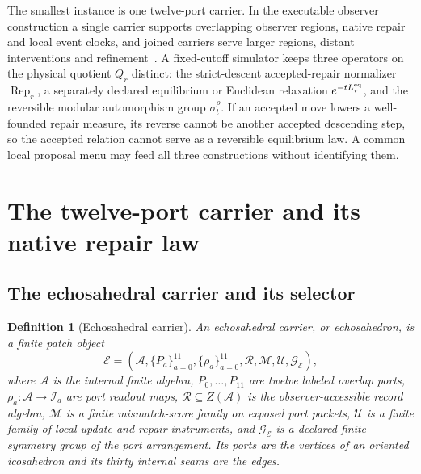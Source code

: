 \documentclass[11pt]{article}
\newtheorem{definition}[theorem]{Definition}
\theoremstyle{remark}
\theoremstyle{plain}
\begin{document}
The smallest instance is one twelve-port carrier. In the executable observer
construction a single carrier supports overlapping observer regions, native
repair and local event clocks, and joined carriers serve larger regions,
distant interventions and refinement~\cite{ophmodel}. A fixed-cutoff
simulator keeps three operators on the physical quotient \(Q_r\) distinct:
the strict-descent accepted-repair normalizer \(\operatorname{Rep}_r\), a
separately declared equilibrium or Euclidean relaxation \(e^{-tL_r^{\rm eq}}\),
and the reversible modular automorphism group \(\sigma_t^\rho\). If an
accepted move lowers a well-founded repair measure, its reverse cannot be
another accepted descending step, so the accepted relation cannot serve as a
reversible equilibrium law. A common local proposal menu may feed all three
constructions without identifying them.
\section{The twelve-port carrier and its native repair law}
\label{sec:twelve-port-carrier}

\subsection{The echosahedral carrier and its selector}

\begin{definition}[Echosahedral carrier]
\label{def:echosahedral-carrier}
An \emph{echosahedral carrier}, or echosahedron, is a finite patch object
\[
\mathcal E=(\mathcal A,\{P_a\}_{a=0}^{11},\{\rho_a\}_{a=0}^{11},
\mathcal R,\mathcal M,\mathcal U,\mathcal G_{\mathcal E}),
\]
where \(\mathcal A\) is the internal finite algebra, \(P_0,\ldots,P_{11}\) are
twelve labeled overlap ports, \(\rho_a:\mathcal A\to\mathcal I_a\) are port
readout maps, \(\mathcal R\subseteq Z(\mathcal A)\) is the observer-accessible
record algebra, \(\mathcal M\) is a finite mismatch-score family on exposed
port packets, \(\mathcal U\) is a finite family of local update and repair
instruments, and \(\mathcal G_{\mathcal E}\) is a declared finite symmetry
group of the port arrangement. Its ports are the vertices of an oriented
icosahedron and its thirty internal seams are the edges.
\end{definition}
\end{document}
